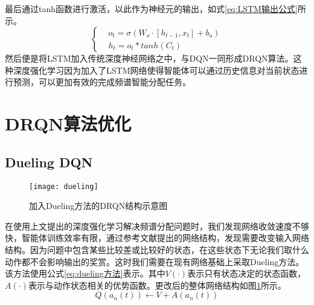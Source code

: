 最后通过tanh函数进行激活，以此作为神经元的输出，如式\ref{eq:LSTM输出公式}所示。
\begin{equation}\label{eq:LSTM输出公式}
\left\lbrace 
\begin{aligned}
&o_{t}=\sigma \left ( W_{o} \cdot \left [ h_{t-1},x_{t} \right ] +b_{o}\right )\\
&h_{t}=o_{t}*tanh\left ( C_{t} \right )
\end{aligned}
\right.
\end{equation}
然后便是将LSTM加入传统深度神经网络之中，与DQN一同形成DRQN算法。这种深度强化学习因为加入了LSTM网络使得智能体可以通过历史信息对当前状态进行预测，可以更加有效的完成频谱智能分配任务。

\section{DRQN算法优化}
\subsection{Dueling DQN}
\begin{figure}[h]
	\centering
	\texttt{[image: dueling]}
	\caption{加入Dueling方法的DRQN结构示意图}
	\label{fig:dueling结构图}
\end{figure}
在使用上文提出的深度强化学习解决频谱分配问题时，我们发现网络收敛速度不够快，智能体训练效率有限，通过参考文献\cite{8254101}提出的网络结构，发现需要改变输入网络结构。因为问题中包含某些比较差或比较好的状态，在这些状态下无论我们取什么动作都不会影响输出的奖赏。这时我们需要在现有网络基础上采取Dueling方法\cite{Wang2015Dueling}。该方法使用公式\ref{eq:dueling方法}表示。其中$V\left(\cdot\right)$表示只有状态决定的状态函数，$A\left(\cdot\right)$表示与动作状态相关的优势函数。更改后的整体网络结构如图\ref{fig:dueling结构图}所示。
\begin{equation}\label{eq:dueling方法}
Q\left ( a_{n}\left (t\right )\right )\leftarrow V + A\left ( a_{n}\left (t\right )\right )  
\end{equation}


